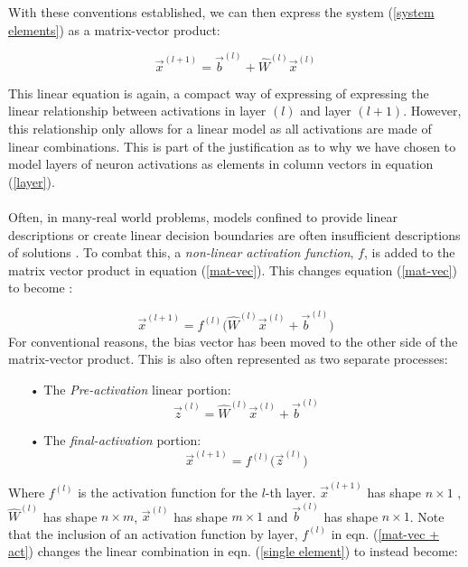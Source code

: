 \documentclass[12pt,letterpaper]{article}
\begin{document}
With these conventions established, we can then express the system (\ref{system elements}) as a matrix-vector product:

\begin{equation}
\label{mat-vec}
\vec{x}^{(l+1)} = \vec{b}^{(l)} + \hat{W}^{(l)} \vec{x}^{(l)}
\end{equation}

This linear equation is again, a compact way of expressing of expressing the linear relationship between activations in layer $(l)$ and layer $(l+1)$. However, this relationship only allows for a linear model as all activations are made of linear combinations. This is part of the justification as to why we have chosen to model layers of neuron activations as elements in column vectors in equation (\ref{layer}). 

\paragraph*{}Often, in many-real world problems, models confined to provide linear descriptions or create linear decision boundaries are often insufficient descriptions of solutions \cite{James}. To combat this, a \textit{non-linear activation function}, $f$, is added to the matrix vector product in equation (\ref{mat-vec}). This changes equation (\ref{mat-vec}) to become \cite{Goodfellow,Loy,Petrik} :

\begin{equation}
\label{mat-vec + act}
\vec{x}^{(l+1)} = f^{(l)} \Big( \hat{W}^{(l)} \vec{x}^{(l)} + \vec{b}^{(l)} \Big)
\end{equation}
For conventional reasons, the bias vector has been moved to the other side of the matrix-vector product. This is also often represented as two separate processes:

\begin{itemize}
\item[•] The \textit{Pre-activation} linear portion:
\begin{equation}
\label{pre-act}
\vec{z}^{(l)} = \hat{W}^{(l)} \vec{x}^{(l)} + \vec{b}^{(l)}
\end{equation}
\item[•] The \textit{final-activation} portion:
\begin{equation}
\label{fin-act}
\vec{x}^{(l+1)} = f^{(l)} \Big( \vec{z}^{(l)} \Big)
\end{equation}
\end{itemize}

Where $f^{(l)}$ is the activation function for the $l$-th layer. $\vec{x}^{(l+1)}$ has shape $n \times 1$ , $\hat{W}^{(l)}$ has shape $n \times m$, $\vec{x}^{(l)}$ has shape $m \times 1$ and $\vec{b}^{(l)}$ has shape $n \times 1$.  Note that the inclusion of an activation function by layer, $f^{(l)}$ in eqn. (\ref{mat-vec + act}) changes the linear combination in eqn. (\ref{single element}) to instead become:
\end{document}
